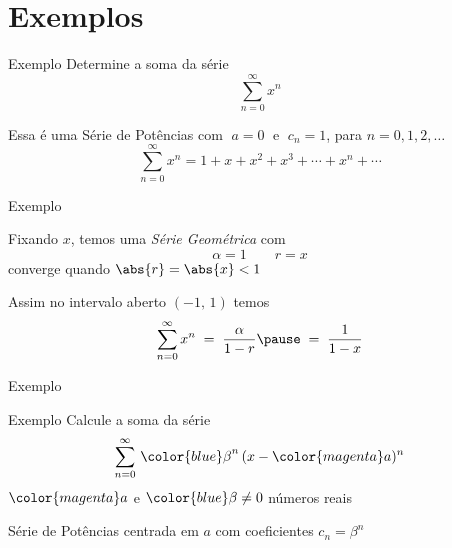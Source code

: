 \section{Exemplos}

\addtocounter{exemplo}{1}
\begin{frame}{Exemplo \theexemplo}
  Determine a soma da série
  \[
    \sum_{n=0}^\infty x^n
  \]

  \pause
  Essa é uma Série de Potências com $\;a=0\;$ e $\;c_n=1$, para $n=0, 1, 2,\dots$
  \[
    \sum_{n=0}^\infty x^n = 1 + x + x^2 + x^3 + \cdots + x^n + \cdots
  \]
\end{frame}

\begin{frame}{Exemplo \theexemplo}

  Fixando $x$, temos uma \emph{Série Geométrica}
  \pause
  com
  \[
    \alpha = 1
    \qquad
    r = x
  \]
  \pause
  converge quando \(\abs{r} = \abs{x} < 1\)

  \pause
  \vspace{\baselineskip}
  Assim no intervalo aberto $(-1,\,1)$ temos
  \[
    \sum_{n=0}^\infty x^n
    \;=\; \frac{\alpha}{1-r}
    \pause
    \;=\; \frac{1}{1-x}
  \]
\end{frame}

\begin{frame}{Exemplo \theexemplo}
  \vspace{1.5\baselineskip}
  \scalebox{0.86}{}
\end{frame}

\addtocounter{exemplo}{1}
\begin{frame}{Exemplo \theexemplo}
  Calcule a soma da série
  \[
    \sum_{n=0}^\infty \,{\color{blue}\beta}^n\,(x-{\color{magenta}a})^n
  \]
  \(\color{magenta}a\) e \({\color{blue}\beta}\neq 0\) números reais

  \pause
  \vspace{\baselineskip}
  Série de Potências centrada em \(a\) com coeficientes \(c_n=\beta^n\)
\end{frame}

